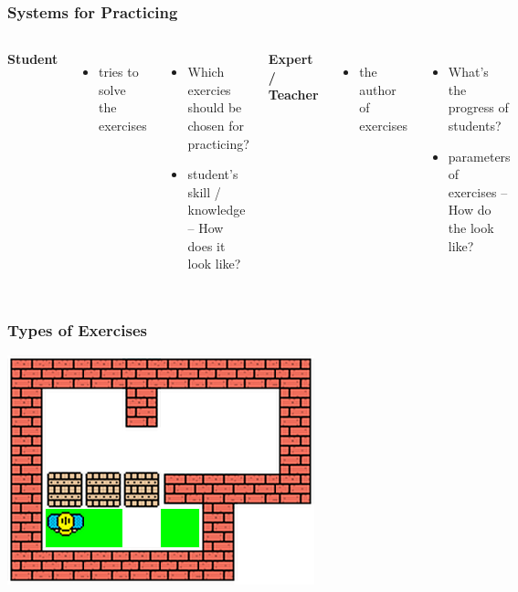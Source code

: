 \documentclass[xcolor=svgnames]{beamer}
\begin{document}
\begin{frame}
	\frametitle{Systems for Practicing}

	\begin{columns}[T]
		\textbf{Student}
		\begin{itemize}
			\item 	tries to solve the exercises
		\end{itemize}

		\bigskip
		\bigskip

		\begin{itemize}
			\item 	Which exercies should be chosen for practicing?
			\item 	student's skill / knowledge -- How does it look like?
		\end{itemize}

		\textbf{Expert / Teacher}
		\begin{itemize}
			\item 	the author of exercises
		\end{itemize}

		\bigskip
		\bigskip
		\begin{itemize}
			\item 	What's the progress of students?
			\item 	parameters of exercises -- How do the look like?
		\end{itemize}
	\end{columns}

\end{frame}
\begin{frame}
	\frametitle{Types of Exercises}

	\begin{center}
		\includegraphics[width=.6\textwidth]{imgs/sokoban.png}
	\end{center}
\end{frame}
\end{document}
